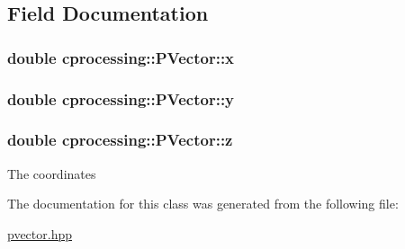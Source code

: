 \subsection{\-Field \-Documentation}
\hypertarget{classcprocessing_1_1PVector_a8cde2eb83b92d0d7b21b335ff6fd62fe}{
\subsubsection[{x}]{\setlength{\rightskip}{0pt plus 5cm}double {\bf cprocessing\-::\-P\-Vector\-::x}}}\label{classcprocessing_1_1PVector_a8cde2eb83b92d0d7b21b335ff6fd62fe}
\hypertarget{classcprocessing_1_1PVector_abb08a1c7f21e21d2c1557d26722a9a02}{
\subsubsection[{y}]{\setlength{\rightskip}{0pt plus 5cm}double {\bf cprocessing\-::\-P\-Vector\-::y}}}\label{classcprocessing_1_1PVector_abb08a1c7f21e21d2c1557d26722a9a02}
\hypertarget{classcprocessing_1_1PVector_a28310efbe3ee03e9d5c01e5869428f70}{
\subsubsection[{z}]{\setlength{\rightskip}{0pt plus 5cm}double {\bf cprocessing\-::\-P\-Vector\-::z}}}\label{classcprocessing_1_1PVector_a28310efbe3ee03e9d5c01e5869428f70}
\-The coordinates 

\-The documentation for this class was generated from the following file\-:\begin{DoxyCompactItemize}
\item 
\hyperlink{pvector_8hpp}{pvector.\-hpp}\end{DoxyCompactItemize}
